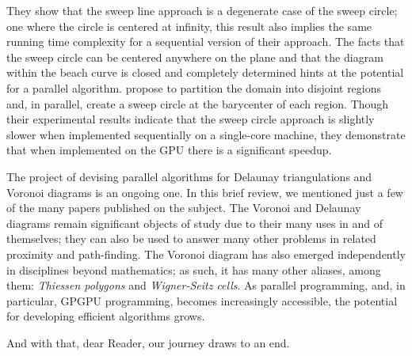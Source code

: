 \documentclass[12pt,twoside]{reedthesis}
\begin{document}
    They show that the sweep line approach is a degenerate case of the sweep circle; one where the circle is centered at infinity, this result also implies the same running time complexity for a sequential version of their approach. The facts that the sweep circle can be centered anywhere on the plane and that the diagram within the beach curve is closed and completely determined hints at the potential for a parallel algorithm. \citeauthor{xin} propose to partition the domain into disjoint regions and, in parallel, create a sweep circle at the barycenter of each region. Though their experimental results indicate that the sweep circle approach is slightly slower when implemented sequentially on a single-core machine, they demonstrate that when implemented on the GPU there is a significant speedup.\par

    The project of devising parallel algorithms for Delaunay triangulations and Voronoi diagrams is an ongoing one. In this brief review, we mentioned just a few of the many papers published on the subject. The Voronoi and Delaunay diagrams remain significant objects of study due to their many uses in and of themselves; they can also be used to answer many other problems in related proximity and path-finding. The Voronoi diagram has also emerged independently in disciplines beyond mathematics; as such, it has many other aliases, among them: \emph{Thiessen polygons} and \emph{Wigner-Seitz cells}. As parallel programming, and, in particular, GPGPU programming, becomes increasingly accessible, the potential for developing efficient algorithms grows.\par

    And with that, dear Reader, our journey draws to an end.




\backmatter
% 
% 
% 
% 
\printbibliography
\end{document}
